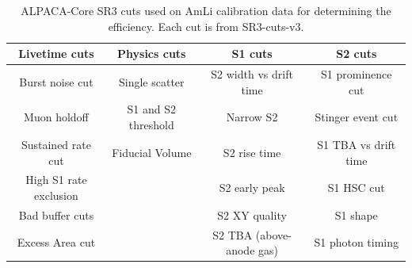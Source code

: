 \begin{table}
	\centering
	\begin{tabular}{c|c|c|c}
		Livetime cuts          & Physics cuts        & S1 cuts                  & S2 cuts              \\
		\hline
		Burst noise cut        & Single scatter      & S2 width vs drift time   & S1 prominence cut    \\
		Muon holdoff           & S1 and S2 threshold & Narrow S2                & Stinger event cut    \\
		Sustained rate cut     & Fiducial Volume     & S2 rise time             & S1 TBA vs drift time \\
		High S1 rate exclusion &                     & S2 early peak            & S1 HSC cut           \\
		Bad buffer cuts        &                     & S2 XY quality            & S1 shape             \\
		Excess Area cut        &                     & S2 TBA (above-anode gas) & S1 photon timing     \\
	\end{tabular}
	\caption{ALPACA-Core SR3 cuts used on AmLi calibration data for determining the efficiency.
		Each cut is from SR3-cuts-v3.
	}
	\label{tab:amli_efficiency_cuts}
\end{table}



